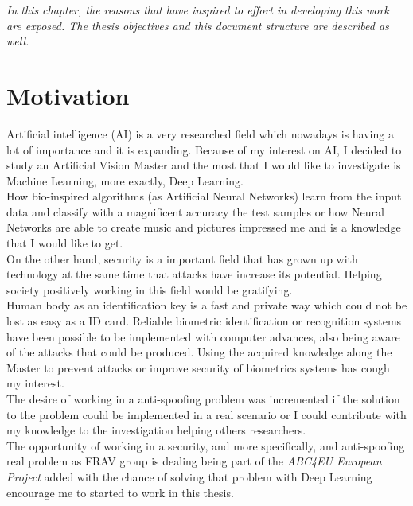 \minitoc
\mtcskip

\begin{small}
\emph{In this chapter, the reasons that have inspired to effort in developing this work are exposed. The thesis objectives and this document structure are described as well.\\}
\end{small}
\section{Motivation}
Artificial intelligence (AI) is a very researched field which nowadays is having a lot of importance and it is expanding. Because of my interest on AI,  I decided to study an Artificial Vision Master and the most that I would like to investigate is Machine Learning, more exactly, Deep Learning.\\

How bio-inspired algorithms (as Artificial Neural Networks) learn from the input data and classify with a magnificent accuracy the test samples or how Neural Networks are able to create music and pictures impressed me and is a knowledge that I would like to get.\\

On the other hand, security is a important field that has grown up with technology at the same time that attacks have increase its potential. Helping society positively working in this field would be gratifying.\\

Human body as an identification key is a fast and private way which could not be lost as easy as a ID card. Reliable biometric identification or recognition  systems have been possible to be implemented with computer advances, also being aware of the attacks that could be produced. Using the acquired knowledge along the Master to prevent attacks or improve security of biometrics systems has cough my interest.\\

The desire of working in a anti-spoofing problem was incremented if the solution to the problem could be implemented in a real scenario or I could contribute with my knowledge to the investigation helping others researchers.\\

The opportunity of working in a security, and more specifically, and anti-spoofing real problem as FRAV group is dealing being part of the \textit{ABC4EU European Project} added with the chance of solving that problem with Deep Learning encourage me to started to work in this thesis.\\

